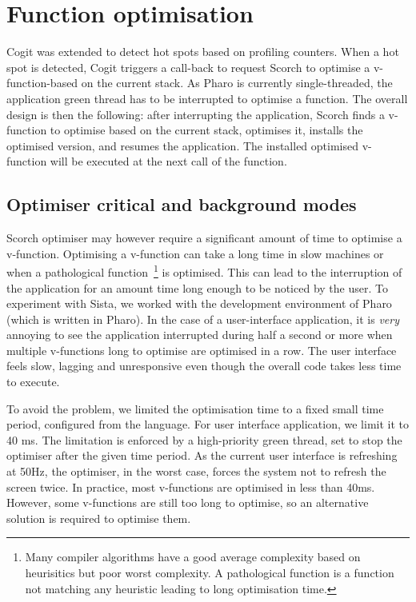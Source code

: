 \documentclass[a4paper,12pt,twoside]{../includes/ThesisStyle}
\begin{document}
\section{Function optimisation}
\label{sec:functionOptimisation}

Cogit was extended to detect hot spots based on profiling counters. When a hot spot is detected, Cogit triggers a call-back to request Scorch to optimise a v-function-based on the current stack. As Pharo is currently single-threaded, the application green thread has to be interrupted to optimise a function. The overall design is then the following: after interrupting the application, Scorch finds a v-function to optimise based on the current stack, optimises it, installs the optimised version, and resumes the application. The installed optimised v-function will be executed at the next call of the function.

\subsection{Optimiser critical and background modes}
\label{sec:optModes}

Scorch optimiser may however require a significant amount of time to optimise a v-function. Optimising a v-function can take a long time in slow machines or when a pathological function~\footnote{Many compiler algorithms have a good average complexity based on heurisitics but poor worst complexity. A pathological function is a function not matching any heuristic leading to long optimisation time.} is optimised. This can lead to the interruption of the application for an amount time long enough to be noticed by the user. To experiment with Sista, we worked with the development environment of Pharo (which is written in Pharo). In the case of a user-interface application, it is \emph{very} annoying to see the application interrupted during half a second or more when multiple v-functions long to optimise are optimised in a row. The user interface feels slow, lagging and unresponsive even though the overall code takes less time to execute.

To avoid the problem, we limited the optimisation time to a fixed small time period, configured from the language. For user interface application, we limit it to 40 ms. The limitation is enforced by a high-priority green thread, set to stop the optimiser after the given time period. As the current user interface is refreshing at 50Hz, the optimiser, in the worst case, forces the system not to refresh the screen twice. In practice, most v-functions are optimised in less than 40ms. However, some v-functions are still too long to optimise, so an alternative solution is required to optimise them.
\end{document}
